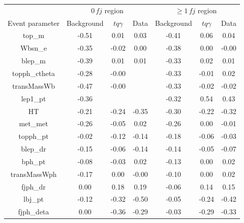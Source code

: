 \begin{table}[htbp]
    \centering
    \begin{tabular}{c|c c c|c c c}
        \toprule
        {}&\multicolumn{3}{c}{$0\, fj$ region}&\multicolumn{3}{c}{$\geq 1\, fj$ region}\\
        Event parameter &  Background &  $tq\gamma$ &  Data &  Background &  $tq\gamma$ &  Data \\
        \midrule
        top\_m                            & -0.51 &      0.01 &   0.03 & -0.41 &      0.06 &   0.04 \\ \hline
        Wbsn\_e                           & -0.35 &     -0.02 &   0.00 & -0.38 &      0.00 &  -0.00 \\ \hline
        blep\_m                           & -0.39 &      0.01 &   0.01 & -0.33 &      0.02 &   0.01 \\ \hline
        topph\_ctheta                     & -0.28 &     -0.00 &     & -0.33 &     -0.01 &   0.02 \\ \hline
        transMassWb                      & -0.47 &     -0.00 &     & -0.33 &     -0.02 &  -0.02 \\ \hline
        lep1\_pt                          & -0.36 &        &     & -0.32 &      0.54 &   0.43 \\ \hline
        HT                               & -0.21 &     -0.24 &  -0.35 & -0.30 &     -0.22 &  -0.32 \\ \hline
        met\_met                          & -0.26 &     -0.05 &   0.02 & -0.26 &      0.00 &  -0.01 \\ \hline
        topph\_pt                         & -0.02 &     -0.12 &  -0.14 & -0.18 &     -0.06 &  -0.03 \\ \hline
        blep\_dr                          & -0.15 &     -0.06 &  -0.14 & -0.14 &     -0.05 &  -0.07 \\ \hline
        bph\_pt                           & -0.08 &     -0.03 &   0.02 & -0.13 &      0.00 &   0.02 \\ \hline
        transMassWph                     & -0.17 &      0.00 &  -0.00 & -0.10 &      0.00 &   0.02 \\ \hline
        fjph\_dr                          &  0.00 &      0.18 &   0.19 & -0.06 &      0.14 &   0.15 \\ \hline
        lbj\_pt                           & -0.12 &     -0.32 &  -0.50 & -0.05 &     -0.24 &  -0.42 \\ \hline
        fjph\_deta                        &  0.00 &     -0.36 &  -0.29 & -0.03 &     -0.29 &  -0.33 \\ \hline

\end{tabular}
\end{table}
